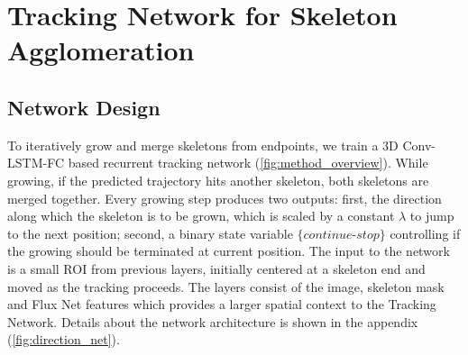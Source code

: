
\section{Tracking Network for Skeleton Agglomeration}

\subsection{Network Design}
To iteratively grow and merge skeletons from endpoints, we train a 3D Conv-LSTM-FC based recurrent tracking network (\autoref{fig:method_overview}). While growing, if the predicted trajectory hits another skeleton, both skeletons are merged together. Every growing step produces two outputs: first, the direction along which the skeleton is to be grown, which is scaled by a constant $\lambda$ to jump to the next position; second, a binary state variable ${\textit{\{continue-stop\}}}$ controlling if the growing should be terminated at current position.  
The input to the network is a small ROI from previous layers, initially centered at a skeleton end and moved as the tracking proceeds. The layers consist of the image, skeleton mask and Flux Net features which provides a larger spatial context to the Tracking Network. Details about the network architecture is shown in the appendix (\autoref{fig:direction_net}).


